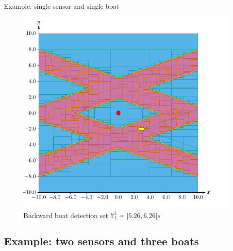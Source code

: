 \documentclass{beamer}
\begin{document}
\begin{frame}{Example: single sensor and single boat}
\begin{minipage}{0.45\textwidth}
\begin{figure}
                            \includegraphics[width=\textwidth]{imgs/backward}
                            \caption{Backward boat detection set $\mathbb{Y}_1^1 = \lbrack5.26, 6.26\rbrack s$}
                    \end{figure}
                \end{minipage}
            \end{frame}

        \subsection{Example: two sensors and three boats}
\end{document}
